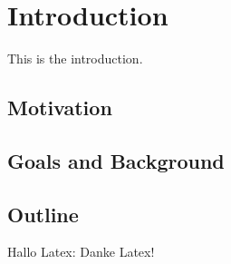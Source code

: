 \chapter{Introduction}
\label{chapter:Introduction}

This is the introduction.

\section{Motivation}
\section{Goals and Background}
\section{Outline}
Hallo Latex: \cite{latex} Danke Latex!
